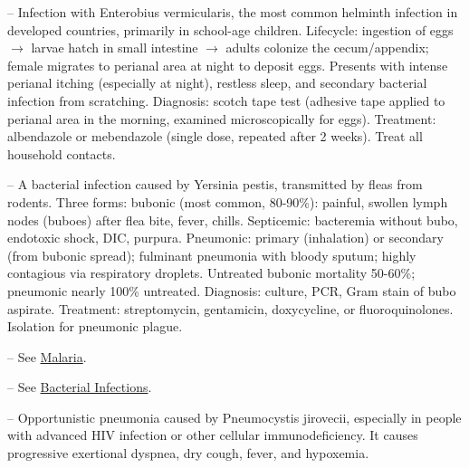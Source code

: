 -- Infection with Enterobius vermicularis, the most common helminth infection in developed countries, primarily in school-age children. Lifecycle: ingestion of eggs $\rightarrow$ larvae hatch in small intestine $\rightarrow$ adults colonize the cecum/appendix; female migrates to perianal area at night to deposit eggs. Presents with intense perianal itching (especially at night), restless sleep, and secondary bacterial infection from scratching. Diagnosis: scotch tape test (adhesive tape applied to perianal area in the morning, examined microscopically for eggs). Treatment: albendazole or mebendazole (single dose, repeated after 2 weeks). Treat all household contacts.

-- A bacterial infection caused by Yersinia pestis, transmitted by fleas from rodents. Three forms: bubonic (most common, 80-90\%): painful, swollen lymph nodes (buboes) after flea bite, fever, chills. Septicemic: bacteremia without bubo, endotoxic shock, DIC, purpura. Pneumonic: primary (inhalation) or secondary (from bubonic spread); fulminant pneumonia with bloody sputum; highly contagious via respiratory droplets. Untreated bubonic mortality 50-60\%; pneumonic nearly 100\% untreated. Diagnosis: culture, PCR, Gram stain of bubo aspirate. Treatment: streptomycin, gentamicin, doxycycline, or fluoroquinolones. Isolation for pneumonic plague.

-- See \hyperlink{Malaria}{Malaria}.

-- See \hyperlink{Bacterial Infections}{Bacterial Infections}.

-- Opportunistic pneumonia caused by Pneumocystis jirovecii, especially in people with advanced HIV infection or other cellular immunodeficiency. It causes progressive exertional dyspnea, dry cough, fever, and hypoxemia.

